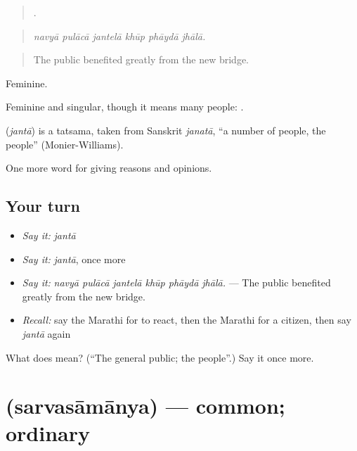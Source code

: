 \begin{quote}
     .
\end{quote}

\begin{quote}
\emph{navyā pulācā jantelā khūp phāydā jhālā.}
\end{quote}

\begin{quote}
The public benefited greatly from the new bridge.
\end{quote}

Feminine.

Feminine and singular, though it means many people:  .

\begin{cousinweb}
\textbf{} (\emph{jantā}) is a tatsama, taken from Sanskrit \emph{janatā}, \textquotedblleft{}a number of people, the people\textquotedblright{} (Monier-Williams).
\end{cousinweb}

\begin{grammarlens}[title={What you've built}]
One more word for giving reasons and opinions.
\end{grammarlens}

\subsection*{Your turn}
\begin{itemize}
\raggedright
  \item \emph{Say it:} \emph{jantā}
  \item \emph{Say it:} \emph{jantā}, once more
  \item \emph{Say it:} \emph{navyā pulācā jantelā khūp phāydā jhālā.} — The public benefited greatly from the new bridge.
  \item \emph{Recall:} say the Marathi for to react, then the Marathi for a citizen, then say \emph{jantā} again
\end{itemize}

\begin{tcolorbox}[breakable,colback=teal!4,colframe=teal!35!black,title={Before you move on}]
What does  mean? (\textquotedblleft{}The general public; the people\textquotedblright{}.) Say it once more.
\end{tcolorbox}
\section[\texorpdfstring{\mr{सर्वसामान्य} (sarvasāmānya)}{सर्वसामान्य (sarvasāmānya)}]{ (sarvasāmānya) — common; ordinary}

